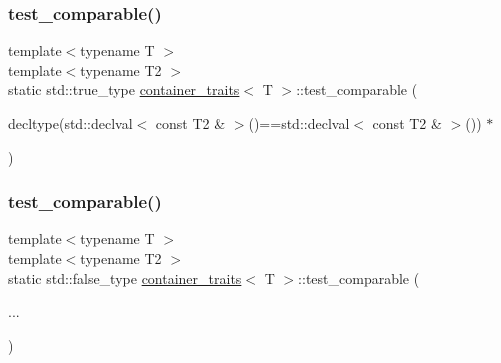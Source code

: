 \subsubsection{\texorpdfstring{test\_comparable()}{test\_comparable()}\hspace{0.1cm}{\footnotesize\ttfamily [1/2]}}
{\footnotesize\ttfamily template$<$typename T $>$ \\
template$<$typename T2 $>$ \\
static std\+::true\+\_\+type \mbox{\hyperlink{structcontainer__traits}{container\+\_\+traits}}$<$ T $>$\+::test\+\_\+comparable (\begin{DoxyParamCaption}\item[{decltype(std\+::declval$<$ const T2 \& $>$()==std\+::declval$<$ const T2 \& $>$()) $\ast$}]{ }\end{DoxyParamCaption})\hspace{0.3cm}{\ttfamily [static]}}

\mbox{\label{structcontainer__traits_ac2cd8fecd9029ec8e2a4d14b04223d6d}} 
\subsubsection{\texorpdfstring{test\_comparable()}{test\_comparable()}\hspace{0.1cm}{\footnotesize\ttfamily [2/2]}}
{\footnotesize\ttfamily template$<$typename T $>$ \\
template$<$typename T2 $>$ \\
static std\+::false\+\_\+type \mbox{\hyperlink{structcontainer__traits}{container\+\_\+traits}}$<$ T $>$\+::test\+\_\+comparable (\begin{DoxyParamCaption}\item[{}]{... }\end{DoxyParamCaption})\hspace{0.3cm}{\ttfamily [static]}}

\mbox{\label{structcontainer__traits_a29ea1a081953a79394605cc9ca7a3694}} 
